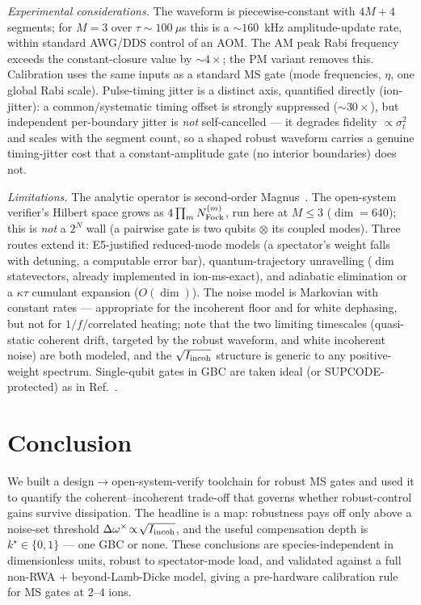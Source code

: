 \documentclass[aps,prapplied,twocolumn,superscriptaddress,floatfix,nofootinbib]{revtex4-2}
\begin{document}
\emph{Experimental considerations.} The waveform is piecewise-constant with $4M+4$ segments;
for $M=3$ over $\tau\sim100~\mu$s this is a $\sim\!160$~kHz amplitude-update rate, within
standard AWG/DDS control of an AOM. The AM peak Rabi frequency exceeds the constant-closure
value by $\sim\!4\times$; the PM variant removes this. Calibration uses the same inputs as a
standard MS gate (mode frequencies, $\eta$, one global Rabi scale). Pulse-timing jitter is a
distinct axis, quantified directly (\textsf{ion-jitter}): a common/systematic timing offset is
strongly suppressed ($\sim\!30\times$), but independent per-boundary jitter is \emph{not}
self-cancelled --- it degrades fidelity $\propto\sigma_t^2$ and scales with the segment count, so
a shaped robust waveform carries a genuine timing-jitter cost that a constant-amplitude gate (no
interior boundaries) does not.

\emph{Limitations.} The analytic operator is second-order Magnus~\cite{Zhang25}. The
open-system verifier's Hilbert space grows as $4\prod_m N_{\rm Fock}^{(m)}$, run here at
$M\!\le\!3$ ($\dim=640$); this is \emph{not} a $2^N$ wall (a pairwise gate is two qubits
$\otimes$ its coupled modes). Three routes extend it: E5-justified reduced-mode models (a
spectator's weight falls with detuning, a computable error bar), quantum-trajectory
unravelling ($\dim$ statevectors, already implemented in \textsf{ion-ms-exact}), and adiabatic
elimination or a $\kappa\tau$ cumulant expansion ($O(\dim)$). The noise model is Markovian with
constant rates --- appropriate for the incoherent floor and for white dephasing, but not for
$1/f$/correlated heating; note that the two limiting timescales (quasi-static coherent drift,
targeted by the robust waveform, and white incoherent noise) are both modeled, and the
$\sqrt{I_{\rm incoh}}$ structure is generic to any positive-weight spectrum. Single-qubit gates
in GBC are taken ideal (or SUPCODE-protected) as in Ref.~\cite{Zhang25}.

\section{Conclusion}
We built a design$\to$open-system-verify toolchain for robust MS gates and used it to quantify
the coherent--incoherent trade-off that governs whether robust-control gains survive
dissipation. The headline is a map: robustness pays off only above a noise-set threshold
$\Delta\omega^\times\!\propto\!\sqrt{I_{\rm incoh}}$, and the useful compensation depth is
$k^\star\!\in\!\{0,1\}$ --- one GBC or none. These conclusions are species-independent in
dimensionless units, robust to spectator-mode load, and validated against a full non-RWA +
beyond-Lamb-Dicke model, giving a pre-hardware calibration rule for MS gates at $2$--$4$ ions.
\end{document}
